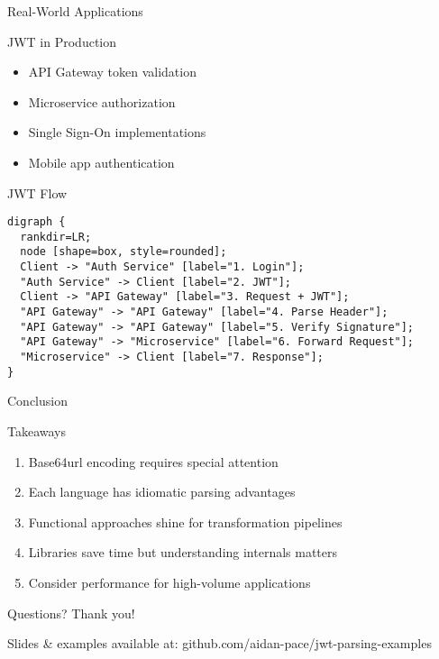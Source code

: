 \documentclass[presentation,aspectratio=169]{beamer}
\begin{document}
\begin{frame}[label={sec:org898983a},fragile]{Real-World Applications}
 \begin{block}{JWT in Production}
\begin{itemize}[<+->]
\item API Gateway token validation
\item Microservice authorization
\item Single Sign-On implementations
\item Mobile app authentication
\end{itemize}
\end{block}
\begin{block}{JWT Flow}
\begin{verbatim}
digraph {
  rankdir=LR;
  node [shape=box, style=rounded];
  Client -> "Auth Service" [label="1. Login"];
  "Auth Service" -> Client [label="2. JWT"];
  Client -> "API Gateway" [label="3. Request + JWT"];
  "API Gateway" -> "API Gateway" [label="4. Parse Header"];
  "API Gateway" -> "API Gateway" [label="5. Verify Signature"];
  "API Gateway" -> "Microservice" [label="6. Forward Request"];
  "Microservice" -> Client [label="7. Response"];
}
\end{verbatim}
\end{block}
\end{frame}
\begin{frame}[label={sec:org64b9327}]{Conclusion}
\begin{block}{Takeaways}
\begin{enumerate}[<+->]
\item Base64url encoding requires special attention
\item Each language has idiomatic parsing advantages
\item Functional approaches shine for transformation pipelines
\item Libraries save time but understanding internals matters
\item Consider performance for high-volume applications
\end{enumerate}
\end{block}
\begin{block}{Questions?}
Thank you!

\alert{Slides \& examples available at:} 
github.com/aidan-pace/jwt-parsing-examples
\end{block}
\end{frame}
\end{document}
